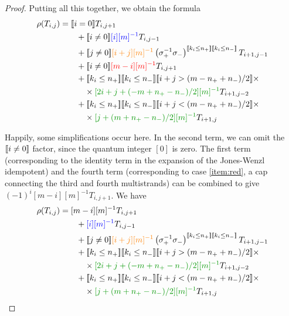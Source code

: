 \documentclass[12pt]{article}
\begin{document}
\begin{proof}
Putting all this together, we obtain the formula
\begin{align*}
\rho(T_{i,j}) & =
\truth{i = 0} T_{i, j + 1} \\
& \qquad +
\truth{i \neq 0} \textcolor{blue}{ [i][m]^{-1}} T_{i,j-1} \\
& \qquad +
\truth{j \neq 0}\textcolor{orange}{[i+j][m]^{-1}} \left(\sigma_+^{-1} \sigma_-\right)^{\truth{k_i \leq n_+} \truth{k_i \leq n_-}} T_{i+1, j-1} \\
& \qquad +
\truth{i \neq 0}\textcolor{red}{  [m-i][m]^{-1}} T_{i, j + 1} \\
& \qquad +
\truth{k_i \leq n_+} \truth{k_i \leq n_-}
\truth{i+j > (m - n_+ + n_-)/2} \times \\
& \qquad \quad \times \textcolor{DarkGreen}{ [2i + j + (-m + n_+ - n_-)/2][m]^{-1}} T_{i+1,j-2} \\
& \qquad +
\truth{k_i \leq n_+} \truth{k_i \leq n_-}
\truth{i+j < (m - n_+ + n_-)/2} \times \\
& \qquad \quad \times \textcolor{DarkGreen}{ [j+ (m + n_+ - n_-)/2 ][m]^{-1}} T_{i+1,j}
\end{align*}

Happily, some simplifications occur here. In the second term, we can omit the $[\![ i\neq0 ]\!]$ factor, since the quantum integer $[0]$ is zero. The first term (corresponding to the identity term in the expansion of the Jones-Wenzl idempotent) and the fourth term (corresponding to case \eqref{item:red}, a cap connecting the third and fourth multistrands) can be combined to give $(-1)^i [m-i][m]^{-1} T_{i,j+1}$. We have
\begin{align*}
\rho(T_{i,j}) & =
[m-i][m]^{-1} T_{i, j + 1} \\
& \qquad +
\textcolor{blue}{ [i][m]^{-1}} T_{i,j-1} \\
& \qquad +
\truth{j \neq 0}\textcolor{orange}{ [i+j][m]^{-1}} \left(\sigma_+^{-1} \sigma_-\right)^{\truth{k_i \leq n_+} \truth{k_i \leq n_-}} T_{i+1, j-1} \\
& \qquad +
\truth{k_i \leq n_+} \truth{k_i \leq n_-}
\truth{i+j > (m - n_+ + n_-)/2} \times \\
& \qquad \quad \times \textcolor{DarkGreen}{ [2i + j + (-m + n_+ - n_-)/2][m]^{-1}} T_{i+1,j-2} \\
& \qquad +
\truth{k_i \leq n_+} \truth{k_i \leq n_-}
\truth{i+j < (m - n_+ + n_-)/2} \times \\
& \qquad \quad \times \textcolor{DarkGreen}{ [j+ (m + n_+ - n_-)/2 ][m]^{-1}} T_{i+1,j}
\end{align*}



\end{proof}
\end{document}
